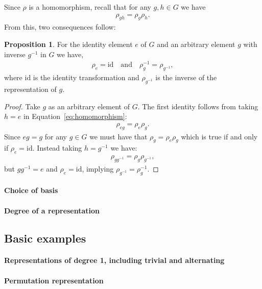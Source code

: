 \documentclass[12pt, a4paper, twoside]{article}
\theoremstyle{definition}
\newtheorem{proposition}[definition]{Proposition}
\theoremstyle{remark}
\numberwithin{equation}{section}
\newcommand{\1}{\mathbf{1}}
\newcommand{\0}{\mathbf{0}}
\newcommand{\id}{\text{id}}
\begin{document}
	Since $\rho$ is a homomorphism, recall that for any $g,h \in G$ we have
	\begin{align}\label{eq:homomorphism}
		\rho_{gh} = \rho_g \rho_h.
	\end{align}
	From this, two consequences follow:
	\begin{proposition}
		For the identity element $e$ of $G$ and an arbitrary element $g$ with inverse $g^{-1}$ in $G$ we have,
		\begin{align*}
			\rho_e = \id \quad \text{and} \quad \rho_g^{-1} = \rho_{g^{-1}},
		\end{align*}
		where $\id$ is the identity transformation and $\rho_{g^{-1}}$ is the inverse of the representation of $g$.
	\end{proposition}
	\begin{proof}
		Take $g$ as an arbitrary element of $G$. The first identity follows from taking $h=e$ in Equation~\ref{eq:homomorphism}:
		\begin{align}
			\rho_{eg} = \rho_e \rho_g.
		\end{align}
		Since $eg=g$ for any $g\in G$ we must have that $\rho_g = \rho_e\rho_g$ which is true if and only if $\rho_e = \id$. Instead taking $h=g^{-1}$ we have:
		\begin{align}
			\rho_{gg^{-1}} = \rho_g \rho_{g^{-1}},
		\end{align}
		but $gg^{-1} = e$ and $\rho_e = \id$, implying $\rho_{g^{-1}} = \rho_g^{-1}$.
	\end{proof}
	
\paragraph{Choice of basis}
\paragraph{Degree of a representation}

\subsection{Basic examples}
\paragraph{Representations of degree 1, including trivial and alternating}
\paragraph{Permutation representation}
\end{document}
